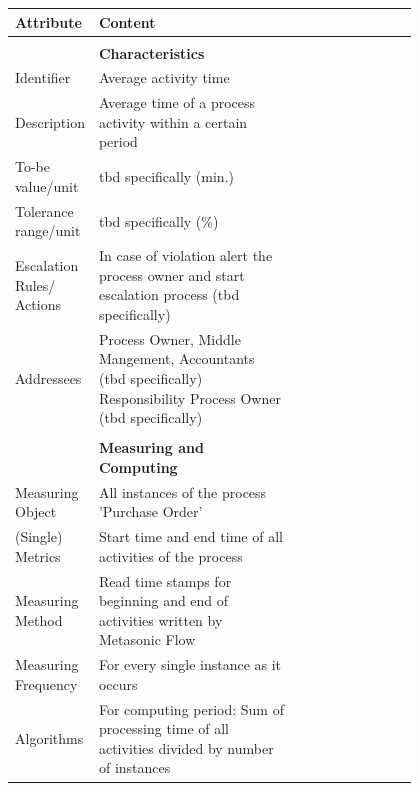 \begin{table}[htbp]
	\footnotesize
	\centering
	\begin{tabular}[t]{@{}l p{0.5\linewidth} p{0.3\linewidth} @{}}
		\toprule
		\textbf{Attribute} & \textbf{Content} \\
		\midrule
		\\
		 & \textbf{Characteristics}
		\\
		Identifier & Average activity time
		\\
		Description & Average time of a process activity within a certain period
		\\
		To-be value/unit & tbd specifically (min.)
		\\
		Tolerance range/unit & tbd specifically (\%)
		\\
		Escalation Rules/ Actions & In case of violation alert the process owner and start escalation process (tbd specifically)
		\\
		Addressees & Process Owner, Middle Mangement, Accountants (tbd specifically)
		Responsibility	Process Owner (tbd specifically)
		\\
		&  &
		\\
		& \textbf{Measuring and Computing}
		\\
		Measuring Object & All instances of the process 'Purchase Order'
		\\
		(Single) Metrics & Start time and end time of all activities of the process
		\\
		Measuring Method & Read time stamps for beginning and end of activities written by Metasonic Flow
		\\
		Measuring Frequency & For every single instance as it occurs
		\\
		Algorithms & For computing period: Sum of processing time of all activities divided by number of instances


\end{tabular}
\end{table}
